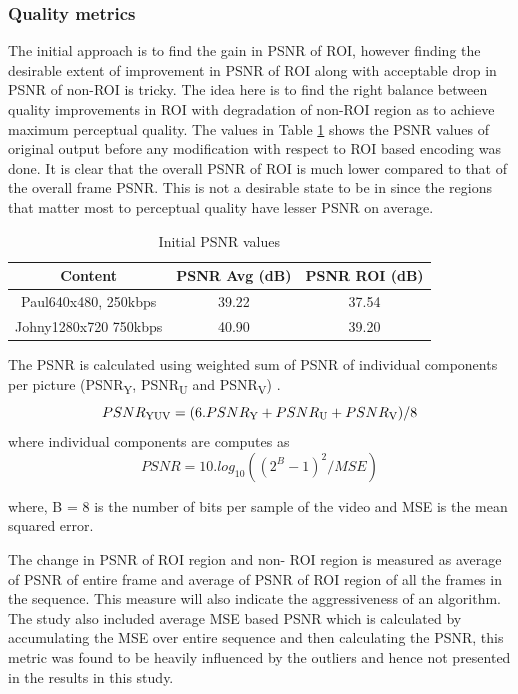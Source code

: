 \documentclass[11pt]{article} %
\begin{document}
\subsubsection{Quality metrics}
The initial approach is to find the gain in PSNR of ROI, however finding the desirable extent of improvement in PSNR of ROI along with acceptable drop in PSNR of non-ROI is tricky. The idea here is to find the right balance between quality improvements in ROI with degradation of non-ROI region as to achieve maximum perceptual quality. The values in Table \ref{InitPSNR1} shows the PSNR values of original output before any modification with respect to ROI based encoding was done. It is clear that the overall PSNR of ROI is much lower compared to that of the overall frame PSNR. This is not a desirable state to be in since the regions that matter most to perceptual quality have lesser PSNR on average.

\begin{table} [h!]
\centering
\begin{tabular}{ |c|c|c| }
 \hline
Content & PSNR Avg (dB) & PSNR ROI (dB) \\
 \hline 
 Paul640x480, 250kbps & 39.22 & 37.54 \\ 
 Johny1280x720 750kbps & 40.90 & 39.20 \\  
 \hline
\end{tabular}
 \caption{Initial PSNR values}
 \label{InitPSNR1}
\end{table}

The PSNR is calculated using weighted sum of PSNR of individual components per picture (PSNR\textsubscript{Y}, PSNR\textsubscript{U} and PSNR\textsubscript{V}) \cite{ComparingCodingEfficiency}.
\begin{equation}
\label{Eq:PSNR}
PSNR\textsubscript{YUV} = ( 6 . PSNR\textsubscript{Y} + PSNR\textsubscript{U} + PSNR\textsubscript{V}) / 8
\end{equation}
 where individual components are computes as
\begin{equation}
\label{Eq:PSNRDef}
PSNR = 10 . log_{10}((2^B - 1)^2 / MSE)
\end{equation}

where, B = 8 is the number of bits per sample of the video and MSE is the mean squared error.

 The change in PSNR of ROI region and non- ROI region is measured as average of PSNR of entire frame and average of PSNR of ROI region of all the frames in the sequence. This measure will also indicate the aggressiveness of an algorithm. The study also included average MSE based PSNR which is calculated by accumulating the MSE over entire sequence and then calculating the PSNR, this metric was found to be heavily influenced by the outliers and hence not presented in the results in this study.
\end{document}
